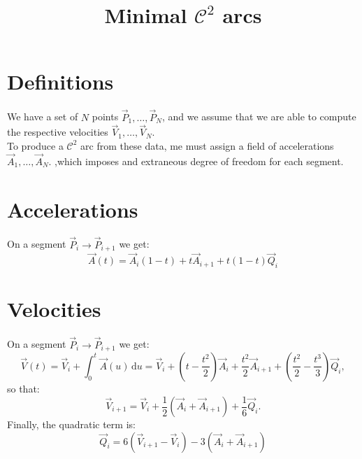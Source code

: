 \documentclass[aps,12pt]{revtex4}
\begin{document}
\title{Minimal $\mathcal{C}^2$ arcs}
\maketitle

\section{Definitions}
We have a set of $N$ points $\vec{P}_1,\ldots,\vec{P}_N$, and we assume
that we are able to compute the respective velocities  $\vec{V}_1,\ldots,\vec{V}_N$.\\
To produce a $\mathcal{C}^2$ arc from these data, 
me must assign a field of accelerations $\vec{A}_1,\ldots,\vec{A}_N$. ,which imposes and extraneous degree of freedom for each segment.

\section{Accelerations}
On a segment $\vec{P}_i \to \vec{P}_{i+1}$ we get:
\begin{equation}
	\vec{A}(t) = \vec{A}_{i} \left(1-t\right) + t \vec{A}_{i+1} + t\left(1-t\right) \vec{Q}_i
\end{equation}

\section{Velocities}
On a segment $\vec{P}_i \to \vec{P}_{i+1}$ we get:
\begin{equation}
	\vec{V}(t) = \vec{V}_{i} + \int_0^t \vec{A}(u)\,\mathrm{d}u = 
	\vec{V}_{i} + 
	\left(t-\frac{t^2}{2}\right) \vec{A}_{i} 
	+ \frac{t^2}{2} \vec{A}_{i+1}
	+ \left(\frac{t^2}{2} - \frac{t^3}{3}\right) \vec{Q}_i,
\end{equation}
so that:
\begin{equation}
	\vec{V}_{i+1} = \vec{V}_{i} + \frac{1}{2} \left(\vec{A}_i+\vec{A}_{i+1}\right) + \frac{1}{6} \vec{Q}_i.
\end{equation}
Finally, the quadratic term is:
\begin{equation}
\boxed{
	\vec{Q}_i = 6\left(\vec{V}_{i+1}-\vec{V}_{i}\right) - 3  \left(\vec{A}_i+\vec{A}_{i+1}\right) 
}
\end{equation}
\end{document}
